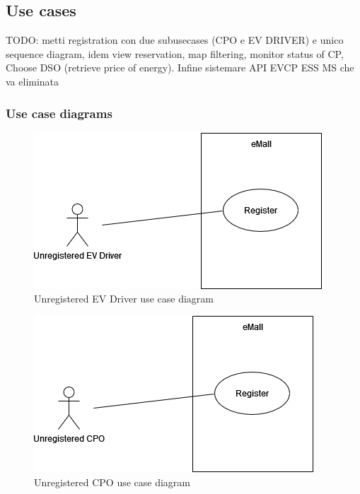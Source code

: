 \subsection{Use cases}
TODO: metti registration con due subusecases (CPO e EV DRIVER) e unico sequence diagram, idem view reservation, map filtering, monitor status of CP, Choose DSO (retrieve price of energy). Infine sistemare API EVCP ESS MS che va eliminata
\subsubsection{Use case diagrams}

\vspace*{3cm}
\begin{figure}[H]
    \centering
    \includegraphics[scale=0.6]{src/use_case_diagram/driver_registration.png}
    \caption{Unregistered EV Driver use case diagram}
\end{figure}
\vspace*{3cm}
\begin{figure}[H]
    \centering
    \includegraphics[scale=0.6]{src/use_case_diagram/cpo_registration.png}
    \caption{Unregistered CPO use case diagram}
\end{figure}

